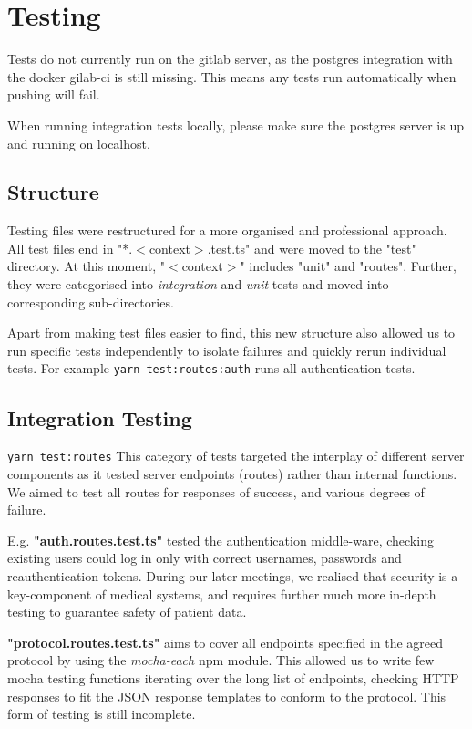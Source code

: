 \section{Testing}
Tests do not currently run on the gitlab server, as the postgres integration with the docker gilab-ci is still missing. This means any tests run automatically when pushing will fail. \par
When running integration tests locally, please make sure the postgres server is up and running on localhost. 
\subsection{Structure}
Testing files were restructured for a more organised and professional approach. All test files end in "*.\(<\)context\(>\).test.ts" and were moved to the "test" directory. At this moment, "\(<\)context\(>\)" includes "unit" and "routes". Further, they were categorised into \textit{integration} and \textit{unit} tests and moved into corresponding sub-directories.  \par
Apart from making test files easier to find, this new structure also allowed us to run specific tests independently to isolate failures and quickly rerun individual tests. For example \texttt{yarn test:routes:auth} runs all authentication tests. 
\subsection{Integration Testing}
\texttt{yarn test:routes} 
This category of tests targeted the interplay of different server components as it tested server endpoints (routes) rather than internal functions. We aimed to test all routes for responses of success, and various degrees of failure. \par
E.g. \textbf{"auth.routes.test.ts"} tested the authentication middle-ware, checking existing users could log in only with correct usernames, passwords and reauthentication tokens. During our later meetings, we realised that security is a key-component of medical systems, and requires further much more in-depth testing to guarantee safety of patient data. \par
\textbf{"protocol.routes.test.ts"} aims to cover all endpoints specified in the agreed protocol by using the \textit{mocha-each} npm module. This allowed us to write few mocha testing functions iterating over the long list of endpoints, checking HTTP responses to fit the JSON response templates to conform to the protocol. This form of testing is still incomplete. 
